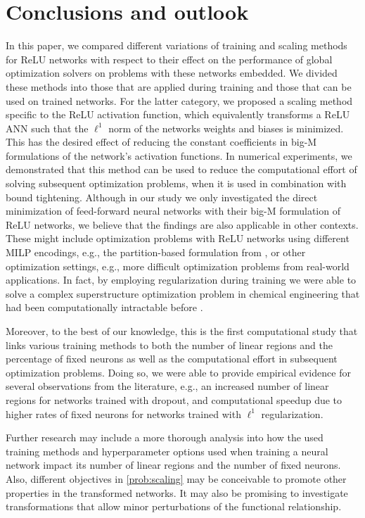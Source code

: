 \section{Conclusions and outlook}\label{sec:discussion}

In this paper, we compared different variations of training and scaling methods for ReLU networks with respect to their effect on the performance of global optimization solvers on problems with these networks  embedded. We divided these methods into those that are applied during training and those that can be used on trained networks. For the latter category, we proposed a scaling method specific to the ReLU activation function, which equivalently transforms a ReLU ANN such that the $\ell^1$ norm of the networks weights and biases is minimized. This has the desired effect of reducing the constant coefficients in big-M formulations of the network's activation functions. In numerical experiments, we demonstrated that this method can be used to reduce the computational effort of solving subsequent optimization problems, when it is used in combination with bound tightening. Although in our study we only investigated the direct minimization of feed-forward neural networks with their big-M formulation of ReLU networks, we believe that the findings are also applicable in other contexts. These might include optimization problems with ReLU networks using different MILP encodings, e.g., the partition-based formulation from \citet{Tsay2021}, or other optimization settings, e.g., more difficult optimization problems from real-world applications. In fact, by employing regularization during training we were able to solve a complex superstructure optimization problem in chemical engineering that had been computationally intractable before \citep{Klimek2024}.

Moreover, to the best of our knowledge, this is the first computational study that links various training methods to both the number of linear regions and the percentage of fixed neurons as well as the computational effort in subsequent optimization problems. Doing so, we were able to provide empirical evidence for several observations from the literature, e.g., an increased number of linear regions for networks trained with dropout, and computational speedup due to higher rates of fixed neurons for networks trained with $\ell^1$ regularization. 

Further research may include a more thorough analysis into how the used training methods and hyperparameter options used when training a neural network impact its number of linear regions and the number of fixed neurons. Also, different objectives in \eqref{prob:scaling} may be conceivable to promote other properties in the transformed networks. It may also be promising to investigate transformations that allow minor perturbations of the functional relationship.